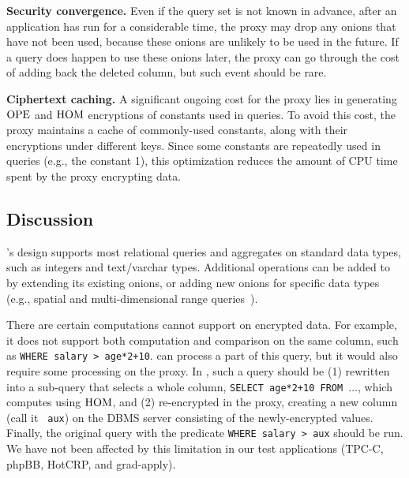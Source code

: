 
\textbf{Security convergence.}  Even if the query set is not known in
advance, after an application has run for a considerable time, the
proxy may drop any onions that have not been used, because these
onions are unlikely to be used in the future.  If a query does happen
to use these onions later, the proxy can go through the cost of
adding back the deleted column, but such event should be rare.

\textbf{Ciphertext caching.}  A significant ongoing cost for the proxy
lies in generating $\textrm{OPE}$ and $\textrm{HOM}$ encryptions of constants used in
queries.  To avoid this cost, the proxy maintains a cache of
commonly-used constants, along with their encryptions under different
keys.  Since some constants are repeatedly used in queries (e.g.,
the constant 1), this optimization reduces the amount of CPU time
spent by the proxy encrypting data.

\subsection{Discussion}

\name{}'s design supports most relational queries and aggregates on
standard data types, such as integers and text/varchar types.
Additional operations can be added to \name{} by extending its
existing onions, or adding new onions for specific data types (e.g.,
spatial and multi-dimensional range
queries~\cite{multidimRangeQueries}).

There are certain computations \name{} cannot support on encrypted
data. For example, it does not support both computation and comparison
on the same column, such as \texttt{WHERE salary > age*2+10}.  \name{}
can process a part of this query, but it would also require some
processing on the proxy.  In \name{}, such a query should be (1)
rewritten into a sub-query that selects a whole column, \texttt{SELECT
  age*2+10 FROM $\ldots$}, which \name{} computes using $\textrm{HOM}$, and
(2) re-encrypted in the proxy, creating a new column (call it {\tt
  aux}) on the DBMS server consisting of the newly-encrypted values.
Finally, the original query with the predicate {\tt WHERE salary >
  aux} should be run.  We have not been affected by this limitation in
our test applications (TPC-C, phpBB, HotCRP, and grad-apply).

